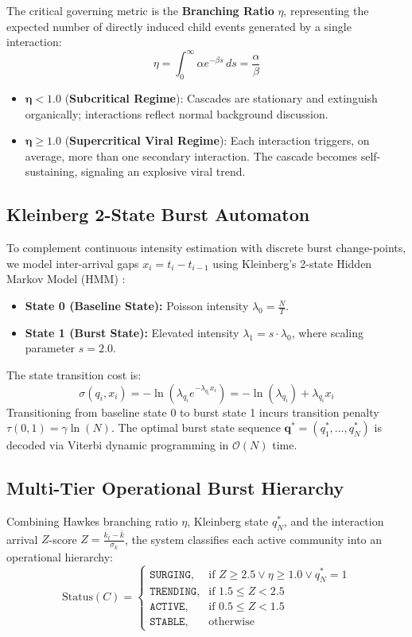 \documentclass[10pt,journal,compsoc]{IEEEtran}
\begin{document}
The critical governing metric is the \textbf{Branching Ratio} $\eta$, representing the expected number of directly induced child events generated by a single interaction:
\begin{equation}
\eta = \int_0^\infty \alpha e^{-\beta s} \, ds = \frac{\alpha}{\beta}
\end{equation}
\begin{itemize}
    \item $\bm{\eta < 1.0}$ (\textbf{Subcritical Regime}): Cascades are stationary and extinguish organically; interactions reflect normal background discussion.
    \item $\bm{\eta \ge 1.0}$ (\textbf{Supercritical Viral Regime}): Each interaction triggers, on average, more than one secondary interaction. The cascade becomes self-sustaining, signaling an explosive viral trend.
\end{itemize}

\subsection{Kleinberg 2-State Burst Automaton}
To complement continuous intensity estimation with discrete burst change-points, we model inter-arrival gaps $x_i = t_i - t_{i-1}$ using Kleinberg's 2-state Hidden Markov Model (HMM) \cite{kleinberg2003bursty}:
\begin{itemize}
    \item \textbf{State 0 (Baseline State):} Poisson intensity $\lambda_0 = \frac{N}{T}$.
    \item \textbf{State 1 (Burst State):} Elevated intensity $\lambda_1 = s \cdot \lambda_0$, where scaling parameter $s = 2.0$.
\end{itemize}
The state transition cost is:
\begin{equation}
\sigma(q_i, x_i) = -\ln \left( \lambda_{q_i} e^{-\lambda_{q_i} x_i} \right) = -\ln(\lambda_{q_i}) + \lambda_{q_i} x_i
\end{equation}
Transitioning from baseline state 0 to burst state 1 incurs transition penalty $\tau(0, 1) = \gamma \ln(N)$. The optimal burst state sequence $\mathbf{q}^* = (q_1^*, \dots, q_N^*)$ is decoded via Viterbi dynamic programming in $\mathcal{O}(N)$ time.

\subsection{Multi-Tier Operational Burst Hierarchy}
Combining Hawkes branching ratio $\eta$, Kleinberg state $q_N^*$, and the interaction arrival $Z$-score $Z = \frac{k_t - \bar{k}}{\sigma_k}$, the system classifies each active community into an operational hierarchy:
\begin{equation}
\text{Status}(C) = \begin{cases}
\texttt{SURGING}, & \text{if } Z \ge 2.5 \lor \eta \ge 1.0 \lor q_N^* = 1 \\
\texttt{TRENDING}, & \text{if } 1.5 \le Z < 2.5 \\
\texttt{ACTIVE}, & \text{if } 0.5 \le Z < 1.5 \\
\texttt{STABLE}, & \text{otherwise}
\end{cases}
\end{equation}
\end{document}

